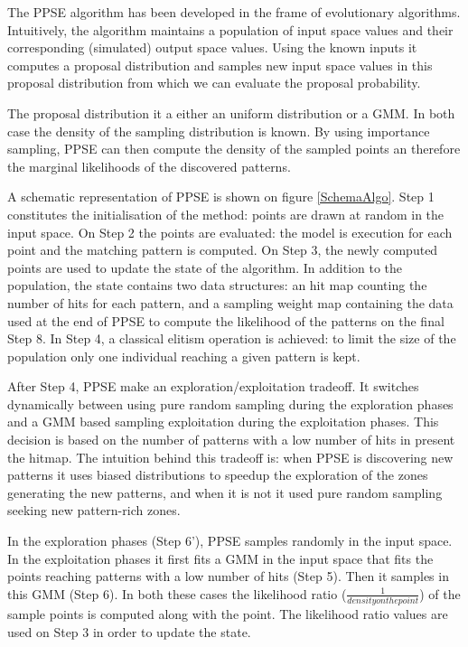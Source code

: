 \documentclass[10pt,letterpaper]{article}
\theoremstyle{definition}
\theoremstyle{remark}
\begin{document}
The PPSE algorithm has been developed in the frame of evolutionary algorithms. Intuitively, the algorithm maintains a population of input space values and their corresponding (simulated) output space values. Using the known inputs it computes a proposal distribution and samples new input space values in this proposal distribution from which we can evaluate the proposal probability. 

The proposal distribution it a either an uniform distribution or a GMM. In both case the density of the sampling distribution is known. By using importance sampling, PPSE can then compute the density of the sampled points an therefore the marginal likelihoods of the discovered patterns.

A schematic representation of PPSE is shown on figure \ref{SchemaAlgo}. Step 1 constitutes the initialisation of the method: points are drawn at random in the input space. On Step 2 the points are evaluated: the model is execution for each point and the matching pattern is computed. On Step 3, the newly computed points are used to update the state of the algorithm. In addition to the population, the state contains two data structures: an hit map counting the number of hits for each pattern, and a sampling weight map containing the data used at the end of PPSE to compute the likelihood of the patterns on the final Step 8. In Step 4, a classical elitism operation is achieved: to limit the size of the population only one individual reaching a given pattern is kept. 

After Step 4, PPSE make an exploration/exploitation tradeoff. It switches dynamically between using pure random sampling during the exploration phases and a GMM based sampling exploitation during the exploitation phases. This decision is based on the number of patterns with a low number of hits in present the hitmap. The intuition behind this tradeoff is: when PPSE is discovering new patterns it uses biased distributions to speedup the exploration of the zones generating the new patterns, and when it is not it used pure random sampling seeking new pattern-rich zones.  

In the exploration phases (Step 6'), PPSE samples randomly in the input space. In the exploitation phases it first fits a GMM in the input space that fits the points reaching patterns with a low number of hits (Step 5). Then it samples in this GMM (Step 6). In both these cases the likelihood ratio ($\frac{1}{density on the point}$) of the sample points is computed along with the point. The likelihood ratio values are used on Step 3 in order to update the state. 
\end{document}
